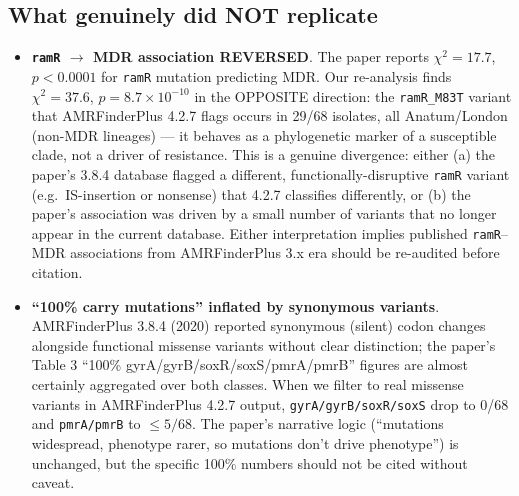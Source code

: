 \documentclass[11pt]{article}
\begin{document}
\subsection{What genuinely did NOT replicate}
\begin{itemize}
  \item \textbf{\texttt{ramR} $\to$ MDR association REVERSED}. The paper reports $\chi^2 = 17.7$, $p < 0.0001$ for \texttt{ramR} mutation predicting MDR. Our re-analysis finds $\chi^2 = 37.6$, $p = 8.7\times10^{-10}$ in the OPPOSITE direction: the \texttt{ramR\_M83T} variant that AMRFinderPlus 4.2.7 flags occurs in 29/68 isolates, all Anatum/London (non-MDR lineages) --- it behaves as a phylogenetic marker of a susceptible clade, not a driver of resistance. This is a genuine divergence: either (a) the paper's 3.8.4 database flagged a different, functionally-disruptive \texttt{ramR} variant (e.g.\ IS-insertion or nonsense) that 4.2.7 classifies differently, or (b) the paper's association was driven by a small number of variants that no longer appear in the current database. Either interpretation implies published \texttt{ramR}--MDR associations from AMRFinderPlus 3.x era should be re-audited before citation.
  \item \textbf{``100\% carry mutations'' inflated by synonymous variants}. AMRFinderPlus 3.8.4 (2020) reported synonymous (silent) codon changes alongside functional missense variants without clear distinction; the paper's Table 3 ``100\% gyrA/gyrB/soxR/soxS/pmrA/pmrB'' figures are almost certainly aggregated over both classes. When we filter to real missense variants in AMRFinderPlus 4.2.7 output, \texttt{gyrA/gyrB/soxR/soxS} drop to 0/68 and \texttt{pmrA/pmrB} to $\le 5/68$. The paper's narrative logic (``mutations widespread, phenotype rarer, so mutations don't drive phenotype'') is unchanged, but the specific 100\% numbers should not be cited without caveat.
\end{itemize}
\end{document}
